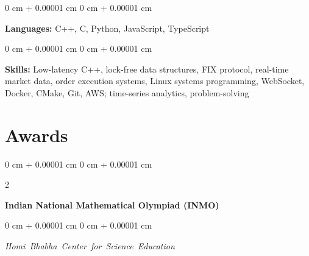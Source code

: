 \documentclass[10pt, letterpaper]{article}
\newenvironment{onecolentry}{
    \begin{adjustwidth}{
        0 cm + 0.00001 cm
    }{
        0 cm + 0.00001 cm
    }
}{
    \end{adjustwidth}
} %
\newenvironment{twocolentry}[2][]{
    \onecolentry
    \def\secondColumn{#2}
    \setcolumnwidth{\fill, 4.5 cm}
    \begin{paracol}{2}
}{
    \switchcolumn \raggedleft \secondColumn
    \end{paracol}
    \endonecolentry
} %
\begin{document}
        
        \begin{onecolentry}
            \textbf{Languages:} C++, C, Python, JavaScript, TypeScript
        \end{onecolentry}

        \vspace{0.2 cm}

        \begin{onecolentry}
            \textbf{Skills:} Low-latency C++, lock-free data structures, FIX protocol, real-time market data, order execution systems, Linux systems programming, WebSocket, Docker, CMake, Git, AWS; time-series analytics, problem-solving
        \end{onecolentry}



    
    \section{Awards}



        
        \begin{samepage}
            \begin{twocolentry}{
                2019
            }
                \textbf{Indian National Mathematical Olympiad (INMO)}
            \end{twocolentry}

            \vspace{0.10 cm}
            
            \begin{onecolentry}
                \mbox{\textit{Homi Bhabha Center for Science Education}}
                \vspace{0.10 cm}
                
            \end{onecolentry}
        \end{samepage}


    
\end{document}
